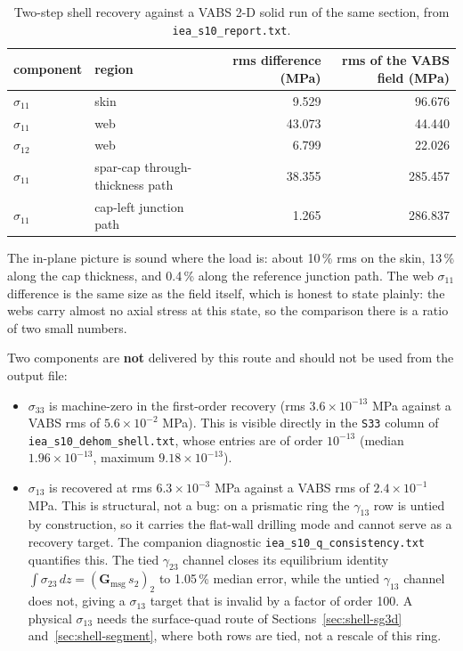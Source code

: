 \begin{table}[htbp]
\centering
\small
\begin{tabular}{llrr}
\toprule
component & region & rms difference (MPa) & rms of the VABS field (MPa) \\
\midrule
$\sigma_{11}$ & skin & 9.529 & 96.676 \\
$\sigma_{11}$ & web & 43.073 & 44.440 \\
$\sigma_{12}$ & web & 6.799 & 22.026 \\
$\sigma_{11}$ & spar-cap through-thickness path & 38.355 & 285.457 \\
$\sigma_{11}$ & cap-left junction path & 1.265 & 286.837 \\
\bottomrule
\end{tabular}
\caption{Two-step shell recovery against a VABS 2-D solid run of the same
section, from \texttt{iea\_s10\_report.txt}.}
\label{tab:shell-dehom-vabs}
\end{table}

The in-plane picture is sound where the load is: about 10\,\% rms on the skin,
13\,\% along the cap thickness, and 0.4\,\% along the reference junction path.
The web $\sigma_{11}$ difference is the same size as the field itself, which is
honest to state plainly: the webs carry almost no axial stress at this state, so
the comparison there is a ratio of two small numbers.

Two components are \textbf{not} delivered by this route and should not be used
from the output file:

\begin{itemize}
\item $\sigma_{33}$ is machine-zero in the first-order recovery (rms
  $3.6\times10^{-13}$ MPa against a VABS rms of $5.6\times10^{-2}$ MPa). This is
  visible directly in the \texttt{S33} column of
  \texttt{iea\_s10\_dehom\_shell.txt}, whose entries are of order $10^{-13}$
  (median $1.96\times10^{-13}$, maximum $9.18\times10^{-13}$).
\item $\sigma_{13}$ is recovered at rms $6.3\times10^{-3}$ MPa against a VABS rms
  of $2.4\times10^{-1}$ MPa. This is structural, not a bug: on a prismatic ring
  the $\gamma_{13}$ row is untied by construction, so it carries the flat-wall
  drilling mode and cannot serve as a recovery target. The companion diagnostic
  \texttt{iea\_s10\_q\_consistency.txt} quantifies this. The tied $\gamma_{23}$
  channel closes its equilibrium identity
  $\int \sigma_{23}\,dz = (\mathbf{G}_{\mathrm{msg}}\,s_2)_2$ to 1.05\,\% median
  error, while the untied $\gamma_{13}$ channel does not, giving a $\sigma_{13}$
  target that is invalid by a factor of order 100. A physical $\sigma_{13}$ needs
  the surface-quad route of Sections~\ref{sec:shell-sg3d}
  and~\ref{sec:shell-segment}, where both rows are tied, not a rescale of this
  ring.
\end{itemize}

